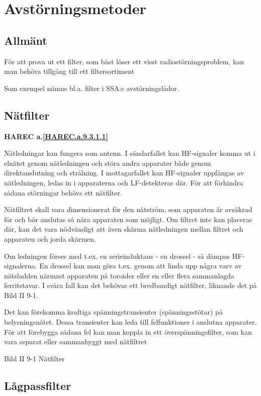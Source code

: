 \section{Avstörningsmetoder}

\subsection{Allmänt}
För att prova ut ett filter, som bäst löser ett visst
radiostörningsproblem, kan man behöva tillgång till ett
filtersortiment

Som exempel nämns bl.a. filter i SSA:s avstörningslådor.

\subsection{Nätfilter}
\textbf{
HAREC a.\ref{HAREC.a.9.3.1.1}\label{myHAREC.a.9.3.1.1}
}

Nätledningar kan fungera som antenn. I sändarfallet kan HF-signaler
komma ut i elnätet genom nätledningen och störa andra apparater både
genom direktanslutning och strålning. I mottagarfallet kan HF-signaler
uppfångas av nätledningen, ledas in i apparaterna och LF-detekteras
där. För att förhindra sådana störningar behövs ett nätfilter.

Nätfiltret skall vara dimensionerat för den nätström, som apparaten är
avsäkrad för och bör anslutas så nära apparaten som möjligt.  Om
filtret inte kan placeras där, kan det vara nödvändigt att även skärma
nätledningen mellan filtret och apparaten och jorda skärmen.

Om ledningen förses med t.ex. en serieinduktans - en drossel - så
dämpas HF-signalerna. En drossel kan man göra t.ex.  genom att linda
upp några varv av nätsladden närmast apparaten på toroider eller en
eller flera sammanlagda ferritstavar. I svåra fall kan det behövas ett
bredbandigt nätfilter, liknande det på Bild II 9-1.

Det kan förekomma kraftiga spänningstransienter (spänningsstötar) på
belysningsnätet. Dessa transienter kan leda till felfunktioner i
anslutna apparater. För att förebygga sådana fel kan man koppla in ett
överspänningsfilter, som kan vara separat eller sammanbyggt med
nätfiltret

Bild II 9-1 Nätfilter

\subsection{Lågpassfilter}

